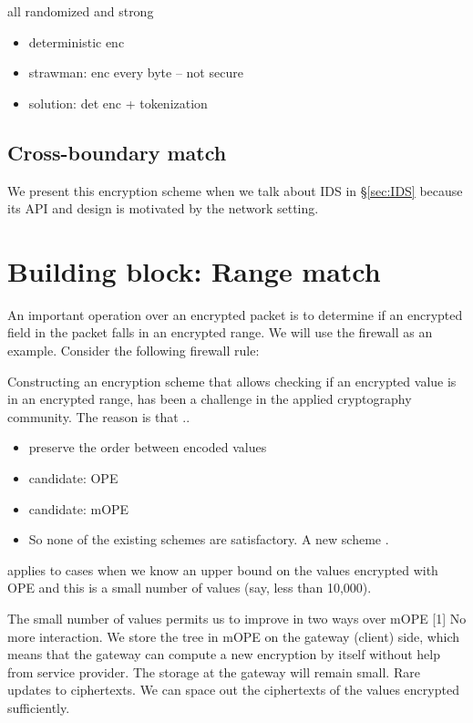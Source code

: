 all randomized and strong

\begin{itemize}
\item deterministic enc
\item strawman: enc every byte -- not secure
\item solution: det enc + tokenization
\end{itemize}

\subsection{Cross-boundary match}

We present this encryption scheme when we talk about IDS in \S\ref{sec:IDS} because its API and design is
motivated by the network setting.

\section{Building block: Range match}
An important operation over an encrypted packet is to determine if an encrypted field in the packet falls in an encrypted range.
We will use the firewall as an example. 
Consider the following firewall rule:

Constructing an encryption scheme that allows checking if an encrypted value is in an encrypted range, has been a challenge in the applied cryptography community. The reason is that ..

\begin{itemize}
\item preserve the order between encoded values
\item candidate: OPE
\item candidate: mOPE
\item So none of the existing schemes are satisfactory. A new scheme \RM.
\end{itemize}

\RM applies to cases when we know an upper bound on the values encrypted with OPE and this is a small number of values (say, less than 10,000).

The small number of values permits us to improve in two ways over mOPE [1]
No more interaction. We store the tree in mOPE on the gateway (client) side, which means that the gateway can compute a new encryption by itself without help from service provider. The storage at the gateway will remain small.
Rare updates to ciphertexts. We can space out the ciphertexts of the values encrypted sufficiently. 

